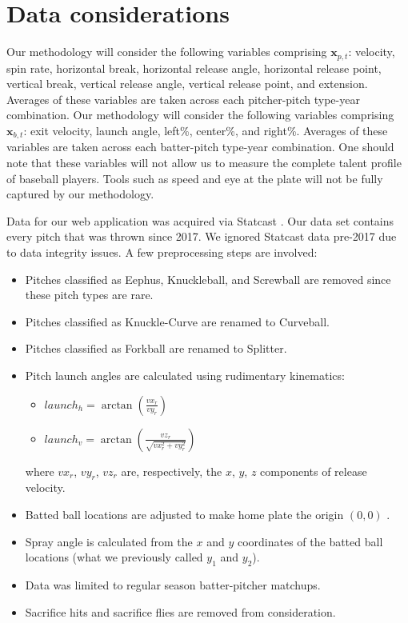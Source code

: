 \documentclass[12pt]{article}
\newcommand{\x}{\textbf{x}}
\begin{document}
\section{Data considerations}

Our methodology will consider the following variables comprising $\x_{p,t}$: velocity, spin rate, horizontal break, horizontal release angle, horizontal release point, vertical break, vertical release angle, vertical release point, and extension. Averages of these variables are taken across each pitcher-pitch type-year combination. Our methodology will consider the following variables comprising $\x_{b,t}$: exit velocity, launch angle, left\%, center\%, and right\%. Averages of these variables are taken across each batter-pitch type-year combination. One should note that these variables will not allow us to measure the complete talent profile of baseball players. %
Tools such as speed and eye at the plate will not be fully captured by our methodology.

Data for our web application was acquired via Statcast \citep{statcast}. Our data set contains every pitch that was thrown since 2017. We ignored Statcast data pre-2017 due to data integrity issues. A few preprocessing steps are involved:
\begin{itemize}
    \item Pitches classified as Eephus, Knuckleball, and Screwball are removed since these pitch types are rare.
    \item Pitches classified as Knuckle-Curve are renamed to Curveball.
    \item Pitches classified as Forkball are renamed to Splitter.
    \item Pitch launch angles are calculated using rudimentary kinematics:
        \begin{itemize}
            \item $launch_h = \arctan(\frac{vx_r}{vy_r})$
            \item $launch_v = \arctan\left(\frac{vz_r}{\sqrt{vx_r^2 + vy_r^2}}\right)$
        \end{itemize}
        where $vx_r$, $vy_r$, $vz_r$ are, respectively, the $x$, $y$, $z$ components of release velocity.
    \item Batted ball locations are adjusted to make home plate the origin $(0,0)$ \citep{petti2017research}.
    \item Spray angle \citep{petti2017research} is calculated from the $x$ and $y$ coordinates of the batted ball locations (what we previously called $y_1$ and $y_2$).
    \item Data was limited to regular season batter-pitcher matchups. 
    \item Sacrifice hits and sacrifice flies are removed from consideration.
\end{itemize}
\end{document}
